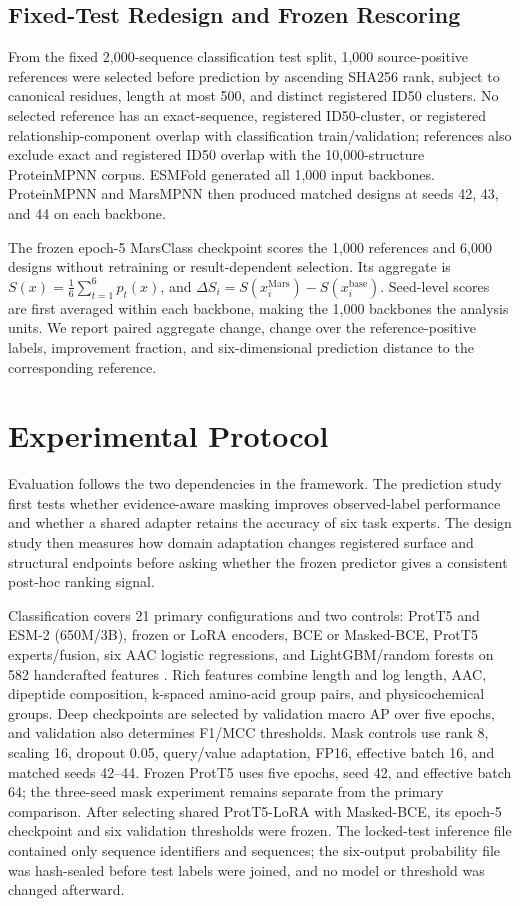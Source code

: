 \documentclass[conference]{IEEEtran}
\begin{document}
\subsection{Fixed-Test Redesign and Frozen Rescoring}
From the fixed 2,000-sequence classification test split, 1,000 source-positive references were selected before prediction by ascending SHA256 rank, subject to canonical residues, length at most 500, and distinct registered ID50 clusters. No selected reference has an exact-sequence, registered ID50-cluster, or registered relationship-component overlap with classification train/validation; references also exclude exact and registered ID50 overlap with the 10,000-structure ProteinMPNN corpus. ESMFold generated all 1,000 input backbones. ProteinMPNN and MarsMPNN then produced matched designs at seeds 42, 43, and 44 on each backbone.

The frozen epoch-5 MarsClass checkpoint scores the 1,000 references and 6,000 designs without retraining or result-dependent selection. Its aggregate is $S(x)=\frac{1}{6}\sum_{t=1}^6p_t(x)$, and $\Delta S_i=S(x_i^{\mathrm{Mars}})-S(x_i^{\mathrm{base}})$. Seed-level scores are first averaged within each backbone, making the 1,000 backbones the analysis units. We report paired aggregate change, change over the reference-positive labels, improvement fraction, and six-dimensional prediction distance to the corresponding reference.

\section{Experimental Protocol}\label{sec:experiments}

Evaluation follows the two dependencies in the framework. The prediction study first tests whether evidence-aware masking improves observed-label performance and whether a shared adapter retains the accuracy of six task experts. The design study then measures how domain adaptation changes registered surface and structural endpoints before asking whether the frozen predictor gives a consistent post-hoc ranking signal.

Classification covers 21 primary configurations and two controls: ProtT5 and ESM-2 (650M/3B), frozen or LoRA encoders, BCE or Masked-BCE, ProtT5 experts/fusion, six AAC logistic regressions, and LightGBM/random forests on 582 handcrafted features \cite{ref12,ref13}. Rich features combine length and log length, AAC, dipeptide composition, k-spaced amino-acid group pairs, and physicochemical groups. Deep checkpoints are selected by validation macro AP over five epochs, and validation also determines F1/MCC thresholds. Mask controls use rank 8, scaling 16, dropout 0.05, query/value adaptation, FP16, effective batch 16, and matched seeds 42--44. Frozen ProtT5 uses five epochs, seed 42, and effective batch 64; the three-seed mask experiment remains separate from the primary comparison. After selecting shared ProtT5-LoRA with Masked-BCE, its epoch-5 checkpoint and six validation thresholds were frozen. The locked-test inference file contained only sequence identifiers and sequences; the six-output probability file was hash-sealed before test labels were joined, and no model or threshold was changed afterward.
\end{document}
